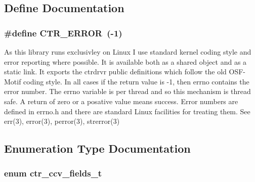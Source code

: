 \subsection{Define Documentation}
\subsubsection{\setlength{\rightskip}{0pt plus 5cm}\#define CTR\_\-ERROR~(-1)}\label{libctr_8doxygen_9fe0cb0facdb58cb9ae0672fb1758893}


As this library runs exclusivley on Linux I use standard kernel coding style and error reporting where possible. It is available both as a shared object and as a static link. It exports the ctrdrvr public definitions which follow the old OSF-Motif coding style. In all cases if the return value is -1, then errno contains the error number. The errno variable is per thread and so this mechanism is thread safe. A return of zero or a posative value means success. Error numbers are defined in errno.h and there are standard Linux facilities for treating them. See err(3), error(3), perror(3), strerror(3) 

\subsection{Enumeration Type Documentation}
\subsubsection{\setlength{\rightskip}{0pt plus 5cm}enum \bf{ctr\_\-ccv\_\-fields\_\-t}}\label{libctr_8doxygen_136487c03ed42da1baa53aed26f69bcf}


